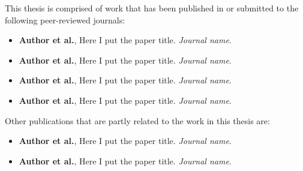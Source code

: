 \begin{publications}

\begin{SingleSpace}
This thesis is comprised of work that has been published in or submitted to the following peer-reviewed journals:

\begin{itemize}
    \item \textbf{Author et al.}, Here I put the paper title. \textit{Journal name}.
    
    \item \textbf{Author et al.}, Here I put the paper title. \textit{Journal name}.
    
    \item \textbf{Author et al.}, Here I put the paper title. \textit{Journal name}.
    
    \item \textbf{Author et al.}, Here I put the paper title. \textit{Journal name}.

\end{itemize}{}

Other publications that are partly related to the work in this thesis are:

\begin{itemize}

    \item \textbf{Author et al.}, Here I put the paper title. \textit{Journal name}.
    
    \item \textbf{Author et al.}, Here I put the paper title. \textit{Journal name}.
    
\end{itemize}{}

\end{SingleSpace}
\end{publications}

